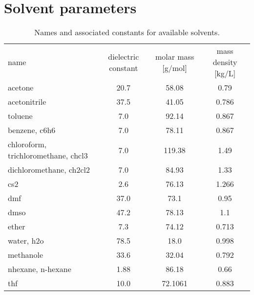 
\chapter{Solvent parameters}
\label{app:solvents}

\begin{table}[htbp]
  \caption{Names and associated constants for available solvents.}
  \begin{tabular}{l*{3}{c}}
    \hline
    \hline
    name & dielectric constant & molar mass [g/mol] & mass density [kg/L] \\
    acetone & 20.7 & 58.08 & 0.79 \\
    acetonitrile & 37.5 & 41.05 & 0.786 \\
    toluene & 7.0 & 92.14 & 0.867 \\
    benzene, c6h6 & 7.0 & 78.11 & 0.867 \\
    chloroform, trichloromethane, chcl3 & 7.0 & 119.38 & 1.49 \\
    dichloromethane, ch2cl2 & 7.0 & 84.93 & 1.33 \\
    cs2 & 2.6 & 76.13 & 1.266 \\
    dmf & 37.0 & 73.1 & 0.95 \\
    dmso & 47.2 & 78.13 & 1.1 \\
    ether & 7.3 & 74.12 & 0.713 \\
    water, h2o & 78.5 & 18.0 & 0.998 \\
    methanole & 33.6 & 32.04 & 0.792 \\
    nhexane, n-hexane & 1.88 & 86.18 & 0.66 \\
    thf & 10.0 & 72.1061 & 0.883 \\
    \hline
    \hline
  \end{tabular}
\end{table}
